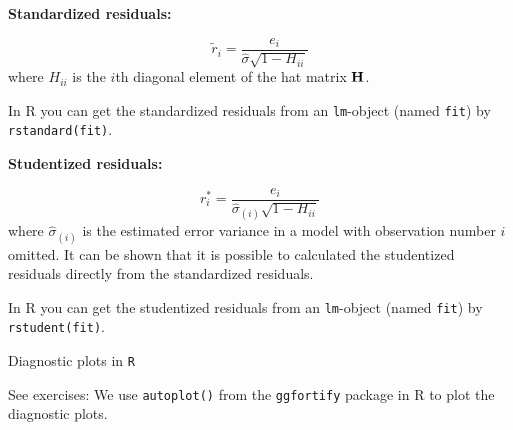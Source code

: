 \documentclass[10pt,ignorenonframetext,]{beamer}
\begin{document}
\begin{frame}[fragile]

\textbf{Standardized residuals:}

\[\tilde{r}_i=\frac{e_i}{\hat{\sigma}\sqrt{1-H_{ii}}}\] where \(H_{ii}\)
is the \(i\)th diagonal element of the hat matrix \({\bf H}\).

In R you can get the standardized residuals from an \texttt{lm}-object
(named \texttt{fit}) by \texttt{rstandard(fit)}.

\vspace{2mm}

\textbf{Studentized residuals:}

\[r^*_i=\frac{e_i}{\hat{\sigma}_{(i)}\sqrt{1-H_{ii}}}\] where
\(\hat{\sigma}_{(i)}\) is the estimated error variance in a model with
observation number \(i\) omitted. It can be shown that it is possible to
calculated the studentized residuals directly from the standardized
residuals.

In R you can get the studentized residuals from an \texttt{lm}-object
(named \texttt{fit}) by \texttt{rstudent(fit)}.

\end{frame}

\begin{frame}[fragile]

\begin{block}{Diagnostic plots in \texttt{R}}

\vspace{2mm}

See exercises: We use \texttt{autoplot()} from the \texttt{ggfortify}
package in R to plot the diagnostic plots.

\end{block}

\end{frame}
\end{document}
